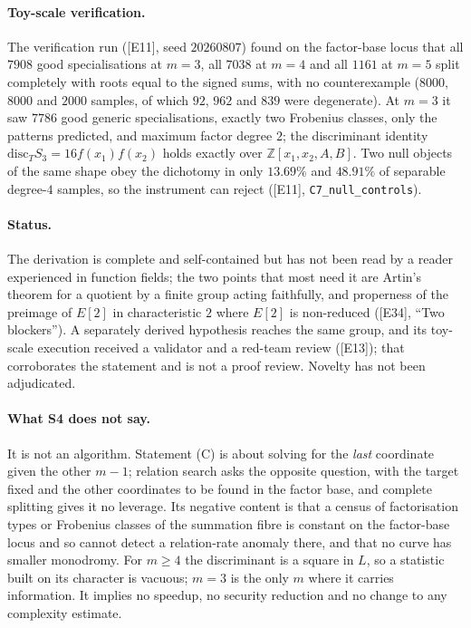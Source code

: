 \documentclass[10pt,a4paper]{article}
\newcommand{\ZZ}{\mathbb{Z}}
\newcommand{\ev}[1]{\textup{[#1]}}
\theoremstyle{definition}
\theoremstyle{remark}
\begin{document}
\paragraph{Toy-scale verification.}
The verification run (\ev{E11}, seed $20260807$) found on the factor-base locus
that all $7908$ good specialisations at $m=3$, all $7038$ at $m=4$ and all $1161$
at $m=5$ split completely with roots equal to the signed sums, with no
counterexample ($8000$, $8000$ and $2000$ samples, of which $92$, $962$ and $839$
were degenerate). At $m=3$ it saw $7786$ good generic specialisations, exactly two
Frobenius classes, only the patterns predicted, and maximum factor degree $2$; the
discriminant identity $\mathrm{disc}_T S_3=16f(x_1)f(x_2)$ holds exactly over
$\ZZ[x_1,x_2,A,B]$. Two null objects of the same shape obey the dichotomy in only
$13.69\%$ and $48.91\%$ of separable degree-$4$ samples, so the instrument can
reject (\ev{E11}, \texttt{C7\_null\_controls}).

\paragraph{Status.}
The derivation is complete and self-contained but has not been read by a reader
experienced in function fields; the two points that most need it are Artin's theorem
for a quotient by a finite group acting faithfully, and properness of the preimage
of $E[2]$ in characteristic $2$ where $E[2]$ is non-reduced (\ev{E34}, ``Two blockers''). A separately derived hypothesis reaches the same group, and its toy-scale
execution received a validator and a red-team review (\ev{E13}); that corroborates
the statement and is not a proof review. Novelty has not been adjudicated.

\paragraph{What S4 does not say.}
It is not an algorithm. Statement (C) is about solving for the \emph{last}
coordinate given the other $m-1$; relation search asks the opposite question, with
the target fixed and the other coordinates to be found in the factor base, and
complete splitting gives it no leverage. Its negative content is that a census of
factorisation types or Frobenius classes of the summation fibre is constant on the
factor-base locus and so cannot detect a relation-rate anomaly there, and that no
curve has smaller monodromy. For $m\ge4$ the discriminant is a square in $L$, so a
statistic built on its character is vacuous; $m=3$ is the only $m$ where it carries
information. It implies no speedup, no security reduction and no change to any
complexity estimate.
\end{document}
